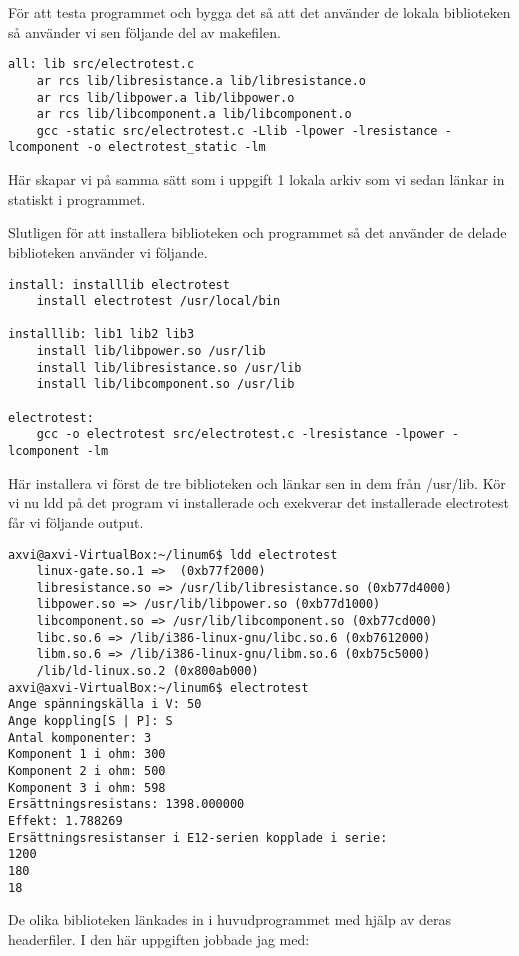 \documentclass[10pt, a4paper]{article}
\begin{document}
För att testa programmet och bygga det så att det använder de lokala biblioteken så använder vi sen följande del av makefilen.
\begin{verbatim}
all: lib src/electrotest.c
    ar rcs lib/libresistance.a lib/libresistance.o
    ar rcs lib/libpower.a lib/libpower.o
    ar rcs lib/libcomponent.a lib/libcomponent.o
    gcc -static src/electrotest.c -Llib -lpower -lresistance -lcomponent -o electrotest_static -lm
\end{verbatim}
Här skapar vi på samma sätt som i uppgift 1 lokala arkiv som vi sedan länkar in statiskt i programmet.

Slutligen för att installera biblioteken och programmet så det använder de delade biblioteken använder vi följande.
\begin{verbatim}
install: installlib electrotest
    install electrotest /usr/local/bin

installlib: lib1 lib2 lib3
    install lib/libpower.so /usr/lib
    install lib/libresistance.so /usr/lib
    install lib/libcomponent.so /usr/lib

electrotest: 
    gcc -o electrotest src/electrotest.c -lresistance -lpower -lcomponent -lm
\end{verbatim}
Här installera vi först de tre biblioteken och länkar sen in dem från /usr/lib.
Kör vi nu ldd på det program vi installerade och exekverar det installerade electrotest får vi följande output.
\begin{verbatim}
axvi@axvi-VirtualBox:~/linum6$ ldd electrotest 
    linux-gate.so.1 =>  (0xb77f2000)
    libresistance.so => /usr/lib/libresistance.so (0xb77d4000)
    libpower.so => /usr/lib/libpower.so (0xb77d1000)
    libcomponent.so => /usr/lib/libcomponent.so (0xb77cd000)
    libc.so.6 => /lib/i386-linux-gnu/libc.so.6 (0xb7612000)
    libm.so.6 => /lib/i386-linux-gnu/libm.so.6 (0xb75c5000)
    /lib/ld-linux.so.2 (0x800ab000)
axvi@axvi-VirtualBox:~/linum6$ electrotest 
Ange spänningskälla i V: 50
Ange koppling[S | P]: S
Antal komponenter: 3
Komponent 1 i ohm: 300
Komponent 2 i ohm: 500
Komponent 3 i ohm: 598
Ersättningsresistans: 1398.000000
Effekt: 1.788269
Ersättningsresistanser i E12-serien kopplade i serie:
1200
180
18
\end{verbatim}

De olika biblioteken länkades in i huvudprogrammet med hjälp av deras headerfiler. I den här uppgiften jobbade jag med:
\end{document}
